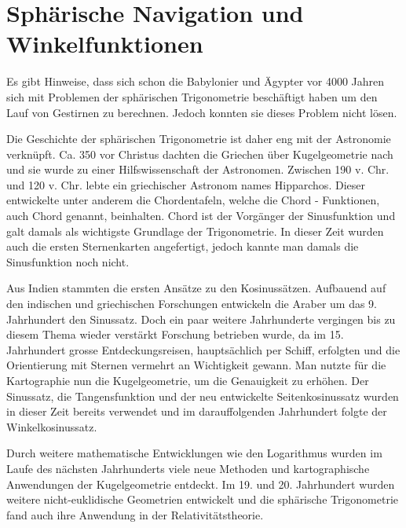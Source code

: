


\section{Sphärische Navigation und Winkelfunktionen}
Es gibt Hinweise, dass sich schon die Babylonier und Ägypter vor 4000 Jahren sich mit Problemen der sphärischen Trigonometrie beschäftigt haben um den Lauf von Gestirnen zu berechnen. 
Jedoch konnten sie dieses Problem nicht lösen. 

Die Geschichte der sphärischen Trigonometrie ist daher eng mit der Astronomie verknüpft. Ca. 350 vor Christus dachten die Griechen über Kugelgeometrie nach und sie wurde zu einer Hilfswissenschaft der Astronomen. 
Zwischen 190 v. Chr. und 120 v. Chr. lebte ein griechischer Astronom names Hipparchos. 
Dieser entwickelte unter anderem die Chordentafeln, welche die Chord - Funktionen, auch Chord genannt, beinhalten. 
Chord ist der Vorgänger der Sinusfunktion und galt damals als wichtigste Grundlage der Trigonometrie.
In dieser Zeit wurden auch die ersten Sternenkarten angefertigt, jedoch kannte man damals die Sinusfunktion noch nicht. 

Aus Indien stammten die ersten Ansätze zu den Kosinussätzen.
Aufbauend auf den indischen und griechischen Forschungen entwickeln die Araber um das 9. Jahrhundert den Sinussatz. 
Doch ein paar weitere Jahrhunderte vergingen bis zu diesem Thema wieder verstärkt Forschung betrieben wurde, da im 15. Jahrhundert grosse Entdeckungsreisen, hauptsächlich per Schiff, erfolgten und die Orientierung mit Sternen vermehrt an Wichtigkeit gewann.
Man nutzte für die Kartographie nun die Kugelgeometrie, um die Genauigkeit zu erhöhen.
Der Sinussatz, die Tangensfunktion und der neu entwickelte Seitenkosinussatz wurden in dieser Zeit bereits verwendet und im darauffolgenden Jahrhundert folgte der Winkelkosinussatz. 

Durch weitere mathematische Entwicklungen wie den Logarithmus wurden im Laufe des nächsten Jahrhunderts viele neue Methoden und kartographische Anwendungen der Kugelgeometrie entdeckt. 
Im 19. und 20. Jahrhundert wurden weitere nicht-euklidische Geometrien entwickelt und die sphärische Trigonometrie fand auch ihre Anwendung in der Relativitätstheorie.